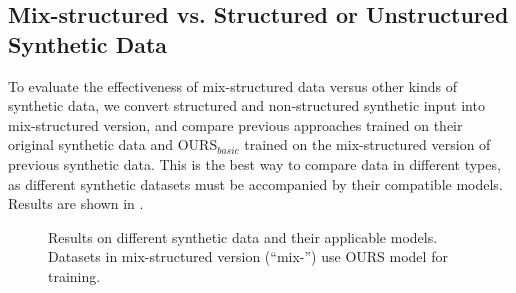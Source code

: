 \subsection{Mix-structured vs. Structured or Unstructured Synthetic Data}
\label{sec:per}
To evaluate the effectiveness of mix-structured data versus
other kinds of synthetic data,
we convert structured and non-structured synthetic input into mix-structured version, and compare previous approaches trained on their original synthetic data
and OURS$_{basic}$ trained on the mix-structured version of previous synthetic data.
This is the best way to compare data in different types,
as different synthetic datasets must be accompanied by their compatible models.
Results are shown in 
.%

\begin{figure}[ht]
	\caption{Results on different synthetic data and their applicable models. Datasets in mix-structured version (``mix-'') use OURS model for training.%
	}
	\label{fig:abl_data}
\end{figure}

